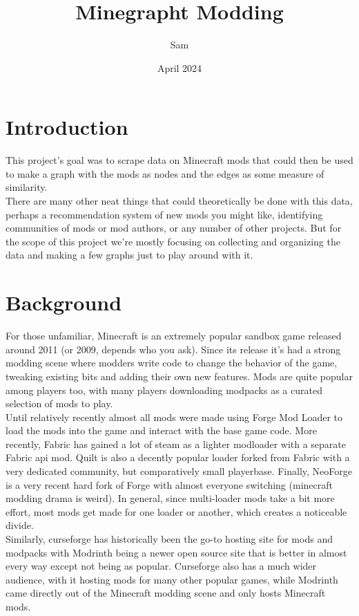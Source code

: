 \documentclass[a4paper,12pt, twocolumn]{article}
\title{Minegrapht Modding}
\date{April 2024}
\author{Sam}
\begin{document}
\maketitle

\section{Introduction}
This project's goal was to scrape data on Minecraft mods that could then be used to make a graph with the mods as nodes and the edges as some measure of similarity.\\

There are many other neat things that could theoretically be done with this data, perhaps a recommendation system of new mods you might like, identifying communities of mods or mod authors, or any number of other projects. But for the scope of this project we're mostly focusing on collecting and organizing the data and making a few graphs just to play around with it.

\section{Background}

For those unfamiliar, Minecraft is an extremely popular sandbox game released around 2011 (or 2009, depends who you ask). Since its release it's had a strong modding scene where modders write code to change the behavior of the game, tweaking existing bits and adding their own new features. Mods are quite popular among players too, with many players downloading modpacks as a curated selection of mods to play.\\

Until relatively recently almost all mods were made using Forge Mod Loader to load the mods into the game and interact with the base game code. More recently, Fabric has gained a lot of steam as a lighter modloader with a separate Fabric api mod. Quilt is also a decently popular loader forked from Fabric with a very dedicated community, but comparatively small playerbase. Finally, NeoForge is a very recent hard fork of Forge with almost everyone switching (minecraft modding drama is weird). In general, since multi-loader mods take a bit more effort, most mods get made for one loader or another, which creates a noticeable divide.\\

Similarly, curseforge has historically been the go-to hosting site for mods and modpacks with Modrinth being a newer open source site that is better in almost every way except not being as popular. Curseforge also has a much wider audience, with it hosting mods for many other popular games, while Modrinth came directly out of the Minecraft modding scene and only hosts Minecraft mods.\\
\end{document}
